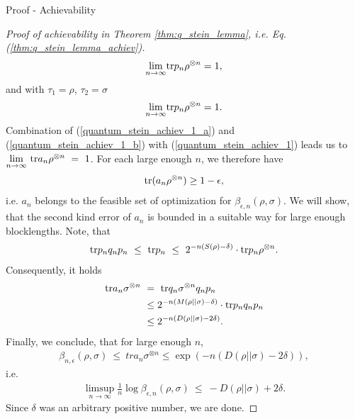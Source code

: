 \begin{subsection}{Proof - Achievability}
\begin{proof}[Proof of achievability in Theorem \ref{thm:q_stein_lemma}, i.e. Eq. (\ref{thm:q_stein_lemma_achiev})]
\begin{align}
   \underset{n \rightarrow \infty}{\lim} \mathrm{tr} p_n \rho^{\otimes n} = 1, \label{quantum_stein_achiev_1_a}
  \end{align}
  and with $\tau_1 = \rho$, $\tau_2 = \sigma$
  \begin{align}
    \underset{n \rightarrow \infty}{\lim} \mathrm{tr} p_n \rho^{\otimes n} = 1. \label{quantum_stein_achiev_1_b}
  \end{align}
  Combination of (\ref{quantum_stein_achiev_1_a}) and (\ref{quantum_stein_achiev_1_b}) with (\ref{quantum_stein_achiev_1}) leads us to
      $\underset{n \rightarrow \infty}{\lim} \ \mathrm{tr} a_n \rho^{\otimes n}  \ = \  1$. 
   For each large enough $n$, we therefore have
   \begin{align}
    \mathrm{tr}(a_n \rho^{\otimes n}) \geq 1 - \epsilon \label{quantum_stein_achiev_2},
   \end{align}
   i.e. $a_n$ belongs to the feasible set of optimization for $\beta_{\epsilon,n}(\rho, \sigma)$. We will show, that the second kind error of $a_n$ is bounded in a suitable way for large enough blocklengths. Note, that 
   \begin{align}
	    \mathrm{tr} p_n q_n p_n 
	    \ \leq \ \mathrm{tr} p_n 
	    \ \leq \ 2^{-n(S(\rho) - \delta)} \cdot \mathrm{tr} p_n \rho^{\otimes n}. 
   \end{align}
   Consequently, it holds
   \begin{align*}
    \tr a_n \sigma^{\otimes n} \ 
    &= \ \tr q_n \sigma^{\otimes n} q_n p_n \\
	&\leq 2^{-n(M(\rho||\sigma) - \delta)} \cdot \tr p_n q_n p_n \\
	&\leq 2^{-n(D(\rho||\sigma)- 2\delta)}.
   \end{align*}
   Finally, we conclude, that for large enough $n$, 
   \begin{align*}
    \beta_{n, \epsilon}(\rho,\sigma)  \ \leq \ tr a_n \sigma^{\otimes n} \leq \exp(-n(D(\rho||\sigma) -2 \delta)),
   \end{align*}
   i.e. 
   \begin{align*}
    \underset{n \rightarrow \infty}{\limsup} \frac{1}{n} \log \beta_{\epsilon, n}(\rho, \sigma) \ \leq \ - D(\rho|| \sigma) + 2 \delta.
   \end{align*}
   Since $\delta$ was an arbitrary positive number, we are done. 
  \end{proof}
  \end{subsection}
